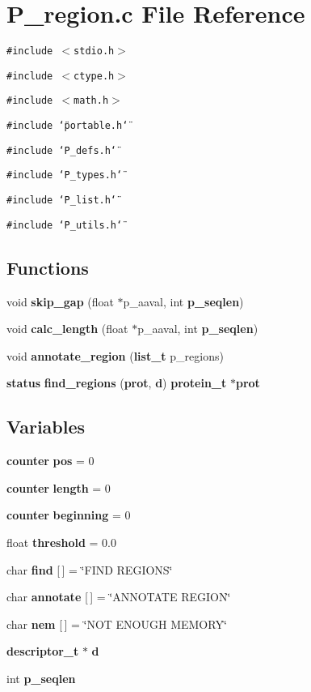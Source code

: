 \section{P\_\-region.c File Reference}
\label{P__region_8c}
{\tt \#include $<$stdio.h$>$}\par
{\tt \#include $<$ctype.h$>$}\par
{\tt \#include $<$math.h$>$}\par
{\tt \#include \char`\"{}portable.h\char`\"{}}\par
{\tt \#include \char`\"{}P\_\-defs.h\char`\"{}}\par
{\tt \#include \char`\"{}P\_\-types.h\char`\"{}}\par
{\tt \#include \char`\"{}P\_\-list.h\char`\"{}}\par
{\tt \#include \char`\"{}P\_\-utils.h\char`\"{}}\par
\subsection*{Functions}
\begin{CompactItemize}
\item 
void {\bf skip\_\-gap} (float $\ast$p\_\-aaval, int {\bf p\_\-seqlen})
\item 
void {\bf calc\_\-length} (float $\ast$p\_\-aaval, int {\bf p\_\-seqlen})
\item 
void {\bf annotate\_\-region} ({\bf list\_\-t} p\_\-regions)
\item 
{\bf status} {\bf find\_\-regions} ({\bf prot}, {\bf d}) {\bf protein\_\-t} $\ast${\bf prot}
\end{CompactItemize}
\subsection*{Variables}
\begin{CompactItemize}
\item 
{\bf counter} {\bf pos} = 0
\item 
{\bf counter} {\bf length} = 0
\item 
{\bf counter} {\bf beginning} = 0
\item 
float {\bf threshold} = 0.0
\item 
char {\bf find} [$\,$] = \char`\"{}FIND REGIONS\char`\"{}
\item 
char {\bf annotate} [$\,$] = \char`\"{}ANNOTATE REGION\char`\"{}
\item 
char {\bf nem} [$\,$] = \char`\"{}NOT ENOUGH MEMORY\char`\"{}
\item 
{\bf descriptor\_\-t} $\ast$ {\bf d}
\item 
int {\bf p\_\-seqlen}
\end{CompactItemize}


